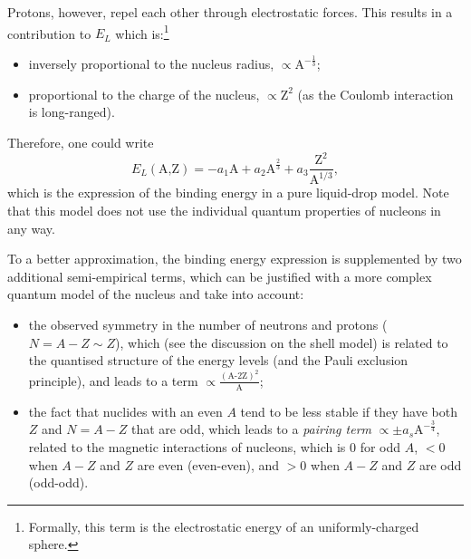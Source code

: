 Protons, however, repel each other through electrostatic forces. This results in a contribution to \(E_L\) which is:\footnote{Formally, this term is the electrostatic energy of an uniformly-charged sphere.}
\begin{itemize}
    \item inversely proportional to the nucleus radius, $\propto \mbox{A}^{-\frac{1}{3}}$;
    \item proportional to the charge of the nucleus, $\propto \mbox{Z}^2$ (as the Coulomb interaction is  long-ranged).
\end{itemize}
Therefore, one could write
\begin{equation*}
    E_L(\mbox{A,Z}) = -a_1\mbox{A} + a_2\mbox{A}^{\frac{2}{3}} + a_3\frac{\mbox{Z}^2}{\mbox{A}^{1/3}},
\end{equation*}
which is the expression of the binding energy in a pure liquid-drop model.
Note that this model does not use the individual quantum properties of nucleons in any way.

To a better approximation, the binding energy expression is supplemented by two additional semi-empirical terms, which can be justified with a more complex quantum model of the nucleus and take into account:
\begin{itemize}
    \item the observed symmetry in the number of neutrons and protons ($N=A-Z\sim Z$), which (see the discussion on the shell model) is related to the quantised structure of the energy levels (and the Pauli exclusion principle), and leads to a term $\propto \frac{(\mbox{A-2Z})^2}{\mbox{A}}$;
    \item the fact that nuclides with an even \(A\) tend to be less stable if they have both \(Z\) and \(N=A-Z\) that are odd, which leads to a \emph{pairing term} \(\propto \pm a_s \mbox{A}^{-\frac{3}{4}}\), related to the magnetic interactions of nucleons, which  is \(0\) for odd \(A\), \(<0\) when \(A-Z\) and \(Z\) are even (even-even), and \(>0\) when \(A-Z\) and \(Z\) are odd (odd-odd).
\end{itemize}

